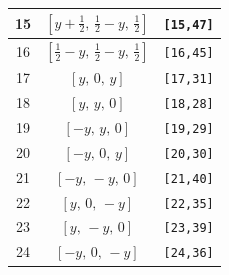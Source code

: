 \documentclass[fleqn,8pt]{jsarticle}
\begin{document}
\begin{longtable}{ccc}
15 & $\left[ y + \frac{1}{2},\, \frac{1}{2} - y,\, \frac{1}{2} \right]$ & {\tt [15,47]} \\ \hline
16 & $\left[ \frac{1}{2} - y,\, \frac{1}{2} - y,\, \frac{1}{2} \right]$ & {\tt [16,45]} \\ \hline
17 & $\left[ y,\, 0,\, y \right]$ & {\tt [17,31]} \\ \hline
18 & $\left[ y,\, y,\, 0 \right]$ & {\tt [18,28]} \\ \hline
19 & $\left[ - y,\, y,\, 0 \right]$ & {\tt [19,29]} \\ \hline
20 & $\left[ - y,\, 0,\, y \right]$ & {\tt [20,30]} \\ \hline
21 & $\left[ - y,\, - y,\, 0 \right]$ & {\tt [21,40]} \\ \hline
22 & $\left[ y,\, 0,\, - y \right]$ & {\tt [22,35]} \\ \hline
23 & $\left[ y,\, - y,\, 0 \right]$ & {\tt [23,39]} \\ \hline
24 & $\left[ - y,\, 0,\, - y \right]$ & {\tt [24,36]} \\
\end{longtable}
\renewcommand{\arraystretch}{1.2}
\end{document}
